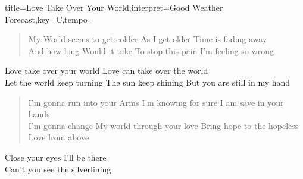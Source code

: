 \documentclass{leadsheet}
\begin{document}
\begin{song}{title={Love Take Over Your World},interpret={Good Weather Forecast},key={C},tempo={}}

\begin{schedule}
\end{schedule}

\begin{verse}
My World seems to get colder
As I get older
Time is fading away \\
And how long
Would it take
To stop this pain
I'm feeling so wrong
\end{verse}

\begin{chorus}
Love take over your world
Love can take over the world \\
Let the world keep turning
The sun keep shining
But you are still in my hand
\end{chorus}

\begin{verse}
I'm gonna run into your Arms
I'm knowing for sure
I am save in your hands \\
I'm gonna change
My world through your love
Bring hope to the hopeless
Love from above
\end{verse}

\begin{bridge}
Close your eyes
I'll be there \\
Can't you see the silverlining
\end{bridge}

\end{song}
\end{document}
